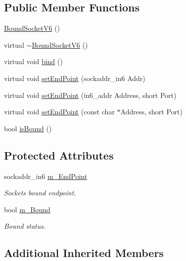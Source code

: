 \subsection*{Public Member Functions}
\begin{DoxyCompactItemize}
\item 
\hyperlink{classBoundSocketV6_a99bee564490f6efa36fe13355adcb7cc}{Bound\+Socket\+V6} ()
\item 
virtual \hyperlink{classBoundSocketV6_ac1c31ca5c4be106325146f76af312144}{$\sim$\+Bound\+Socket\+V6} ()
\item 
virtual void \hyperlink{classBoundSocketV6_a76ed837cd1fb36bbc1383f5e7e381095}{bind} ()
\item 
virtual void \hyperlink{classBoundSocketV6_a9f16093436c0325253bbb4069bffce0d}{set\+End\+Point} (sockaddr\+\_\+in6 Addr)
\item 
virtual void \hyperlink{classBoundSocketV6_a3bcb3acaa01f814957b5dc3233cdb0c9}{set\+End\+Point} (in6\+\_\+addr Address, short Port)
\item 
virtual void \hyperlink{classBoundSocketV6_a183ca4435804e6d1ea616c8c74e26e46}{set\+End\+Point} (const char $\ast$Address, short Port)
\item 
bool \hyperlink{classBoundSocketV6_a2a29edc5ad339f83b06bdbc413d949b2}{is\+Bound} ()
\end{DoxyCompactItemize}
\subsection*{Protected Attributes}
\begin{DoxyCompactItemize}
\item 
sockaddr\+\_\+in6 \hyperlink{classBoundSocketV6_abf6063eee350425ae5a105200be62df0}{m\+\_\+\+End\+Point}
\begin{DoxyCompactList}\small\item\em Socket\textquotesingle{}s bound endpoint. \end{DoxyCompactList}\item 
bool \hyperlink{classBoundSocketV6_a0f09faafc821fe3ebe890821d1b4cb10}{m\+\_\+\+Bound}
\begin{DoxyCompactList}\small\item\em Bound status. \end{DoxyCompactList}\end{DoxyCompactItemize}
\subsection*{Additional Inherited Members}


